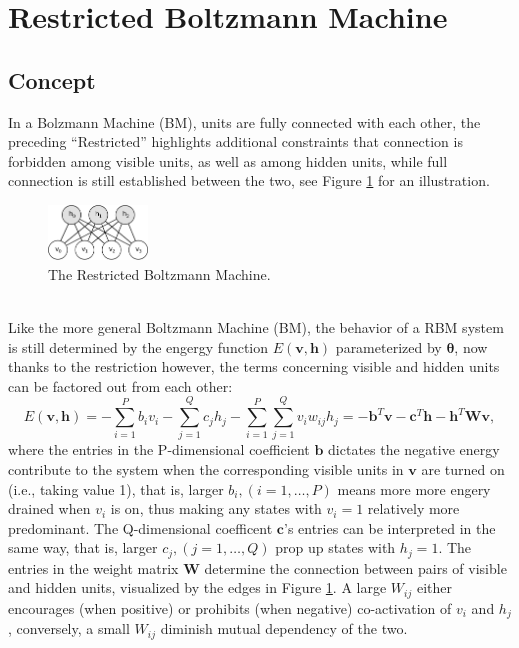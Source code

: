 \documentclass[11pt]{article}
\newcommand{\vb}{\boldsymbol{b}}
\newcommand{\vc}{\boldsymbol{c}}
\newcommand{\vh}{\boldsymbol{h}}
\newcommand{\vv}{\boldsymbol{v}}
\newcommand{\mw}{\boldsymbol{W}}
\newcommand{\pEC}{\boldsymbol{\theta}}
\begin{document}
{\section{Restricted Boltzmann Machine}
\subsection{Concept}
In a Bolzmann Machine (BM), units are fully connected with each other, the preceding ``Restricted'' highlights additional constraints that connection is forbidden among visible units, as well as among hidden units, while full connection is still established between the two, see Figure \ref{fig:rbm} for an illustration.
\begin{figure}[h]
  \centering
  \includegraphics[width=100px]{img/rbm.png}
  \caption{The Restricted Boltzmann Machine.}\label{fig:rbm}
\end{figure} \\
Like the more general Boltzmann Machine (BM), the behavior of a RBM system is still determined by the engergy function $E(\vv, \vh)$ parameterized by $\pEC$, now thanks to the restriction however, the terms concerning visible and hidden units can be factored out from each other:
\begin{equation} \label{eq:rbm:e(s)}
  E(\vv, \vh) = -\sum_{i=1}^{P}{b_i v_i} - \sum_{j=1}^{Q}{c_j h_j} - \sum_{i=1}^P\sum_{j=1}^Q{v_i w_{ij} h_j} = -\vb^T \vv - \vc^T \vh - \vh^T \mw \vv,
\end{equation}
where the entries in the P-dimensional coefficient $\vb$ dictates the negative energy contribute to the system when the corresponding visible units in $\vv$ are turned on (i.e., taking value 1), that is, larger $b_i, (i=1, \dots, P)$ means more more engery drained when $v_i$ is on, thus making any states with $v_i=1$ relatively more predominant. The Q-dimensional coefficent $\vc$'s entries can be interpreted in the same way, that is, larger $c_j, (j=1, \dots, Q)$ prop up states with $h_j=1$. The entries in the weight matrix $\mw$ determine the connection between pairs of visible and hidden units, visualized by the edges in Figure \ref{fig:rbm}. A large $W_{ij}$ either encourages (when positive) or prohibits (when negative) co-activation of $v_i$ and $h_j$, conversely, a small $W_{ij}$ diminish mutual dependency of the two.
}
\end{document}
